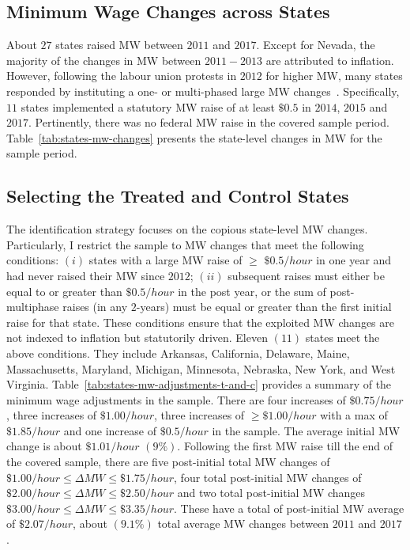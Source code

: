 \documentclass[12pt, english]{article}
\begin{document}
    \subsection{Minimum Wage Changes across States}\label{subsec:minimum-wage-changes-across-states}
    About $27$ states raised MW between $2011$ and $2017$. Except for Nevada, the majority of the changes in MW between $2011-2013$ are attributed to inflation. However, following the labour union protests in $2012$ for higher MW, many states responded by instituting a one- or multi-phased large MW changes~\parencite{lathrop2021raises}. Specifically, $11$ states implemented a statutory MW raise of at least $\$0.5$ in $2014$, $2015$ and $2017$. Pertinently, there was no federal MW raise in the covered sample period. Table~\ref{tab:states-mw-changes} presents the state-level changes in MW for the sample period.

    \subsection{Selecting the Treated and Control States}\label{subsec:selecting-the-treated-and-control-states}
    The identification strategy focuses on the copious state-level MW changes. Particularly, I restrict the sample to MW changes that meet the following conditions: $(i)$ states with a large MW raise of $\geq$ $\$0.5/hour$ in one year and had never raised their MW since $2012$; $(ii)$ subsequent raises must either be equal to or greater than $\$0.5/hour$ in the post year, or the sum of post-multiphase raises (in any $2$-years) must be equal or greater than the first initial raise for that state. These conditions ensure that the exploited MW changes are not indexed to inflation but statutorily driven. Eleven $(11)$ states meet the above conditions. They include Arkansas, California, Delaware, Maine, Massachusetts, Maryland, Michigan, Minnesota, Nebraska, New York, and West Virginia. Table~\ref{tab:states-mw-adjustments-t-and-c} provides a summary of the minimum wage adjustments in the sample. There are four increases of $\$0.75/hour$, three increases of $\$1.00/hour$, three increases of $\geq \$1.00/hour$ with a max of $\$1.85/hour$ and one increase of $\$0.5/hour$ in the sample. The average initial MW change is about $\$1.01/hour$ $(9\%)$. Following the first MW raise till the end of the covered sample, there are five post-initial total MW changes of $\$1.00/hour \leq \Delta MW \leq \$1.75/hour$, four total post-initial MW changes of $\$2.00/hour \leq \Delta MW \leq \$2.50/hour$ and two total post-initial MW changes $\$3.00/hour \leq \Delta MW \leq \$3.35/hour$. These have a total of post-initial MW average of $\$2.07/hour$, about $(9.1\%)$ total average MW changes between $2011$ and $2017$.
    
\end{document}
